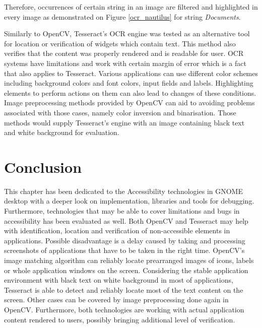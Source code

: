 Therefore, occurrences of certain string in an image are filtered and highlighted in every image as demonstrated on Figure \ref{ocr_nautilus} for string \textit{Documents}.

Similarly to OpenCV, Tesseract's OCR engine was tested as an alternative tool for location or verification of widgets which contain text. This method also verifies that the content was properly rendered and is readable for user. OCR systems have limitations and work with certain margin of error which is a fact that also applies to Tesseract. Various applications can use different color schemes including background colors and font colors, input fields and labels. Highlighting elements to perform actions on them can also lead to changes of these conditions. Image preprocessing methods provided by OpenCV can aid to avoiding problems associated with those cases, namely color inversion and binarisation. Those methods would supply Tesseract's engine with an image containing black text and white background for evaluation.

\section{Conclusion}
This chapter has been dedicated to the Accessibility technologies in GNOME desktop with a deeper look on implementation, libraries and tools for debugging. Furthermore, technologies that may be able to cover limitations and bugs in accessibility has been evaluated as well. Both OpenCV and Tesseract may help with identification, location and verification of non-accessible elements in applications. Possible disadvantage is a delay caused by taking and processing screenshots of applications that have to be taken in the right time. OpenCV's image matching algorithm can reliably locate prearranged images of icons, labels or whole application windows on the screen. Considering the stable application environment with black text on white background in most of applications, Tesseract is able to detect and reliably locate most of the text content on the screen. Other cases can be covered by image preprocessing done again in OpenCV. Furthermore, both technologies are working with actual application content rendered to users, possibly bringing additional level of verification.

